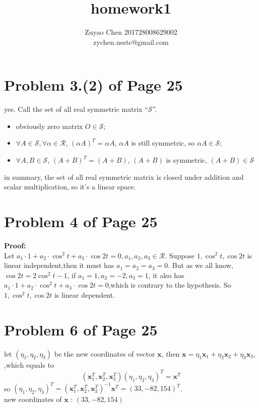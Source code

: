 \documentclass[12pt,a4paper]{article}
\title{homework1}
\author{Zuyao Chen 201728008629002 \\ zychen.uestc@gmail.com}
\date{}
\newcommand{\mysection}[2]{
\section{Problem #1 of Page #2}	
	}
\begin{document}
\maketitle
\mysection{3.(2)}{25}
yes. 
Call the set of all real symmetric matrix ``$\mathcal{S}$''.
\begin{itemize}
	\item obviously zero matrix $O \in \mathcal{S}$;
	\item $\forall A \in \mathcal{S},\forall \alpha \in \mathcal{R}$, 
			$(\alpha A)^{T} = \alpha A$, $\alpha A$ is still symmetric,
			so $\alpha A \in \mathcal{S}$;
	\item $\forall A , B \in \mathcal{S}$, $(A+B)^{T} = (A+B)$,
			$(A+B)$ is symmetric, $(A+B) \in \mathcal{S}$		
\end{itemize}
in summary,	the set of all real symmetric matrix is closed under addition and scalar multiplication, so it's a linear space.
\mysection{4}{25}
\textbf{Proof:} \\
\indent Let
$a_1 \cdot 1 + a_2 \cdot \cos^{2}t + a_3 \cdot \cos 2t = 0,a_1,a_2,a_3 \in \mathcal{R}$.
Suppose $1, \cos^{2} t, \cos 2t$ is linear independent,then 
it must has $ a_1 = a_2 = a_3 = 0$.
But as we all know,$\cos 2t = 2\cos^{2} t - 1$,
if $a_1 = 1, a_2 = -2 , a_3 = 1$, it also has $a_1 \cdot 1 + a_2 \cdot \cos^{2}t + a_3 \cdot \cos 2t = 0$,which is contrary to the hypothesis.
So $1, \cos^{2} t, \cos 2t$ is linear dependent.

\mysection{6}{25}
let $(\eta_1,\eta_2,\eta_3)$ be the new coordinates of vector $\mathbf{x}$,
then 
$\mathbf{x}= \eta_1\mathbf{x}_1 + \eta_2\mathbf{x}_2+ \eta_3\mathbf{x}_3 $,
,which equals to 
\[
(\mathbf{x}_1^{T},\mathbf{x}_2^{T},\mathbf{x}_3^{T}) (\eta_1,\eta_2,\eta_3)^{T} = \mathbf{x}^{T}
\]
so $(\eta_1,\eta_2,\eta_3)^{T} 
= (\mathbf{x}_1^{T},\mathbf{x}_2^{T},\mathbf{x}_3^{T})^{-1}\mathbf{x}^{T} 
= (33,-82,154)^{T}$.\\
new coordinates of $\mathbf{x}$ : $(33,-82,154)$
\end{document}
